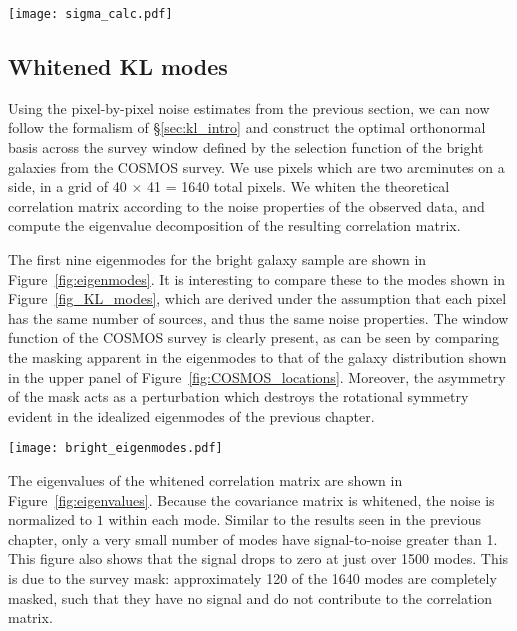 \begin{figure*}
 \centering
 \texttt{[image: sigma\_calc.pdf]}
 \caption{Bootstrap estimates of the shape noise for each pixel.  The estimates
   reflect an intrinsic ellipticity of $0.393 \pm 0.013$.
   \label{fig:bootstrap}}
\end{figure*}

\subsection{Whitened KL modes}
Using the pixel-by-pixel noise estimates from the previous section, we can
now follow the formalism of \S\ref{sec:kl_intro} and construct the optimal
orthonormal basis across the survey window defined by the selection function
of the bright galaxies from the COSMOS survey.  We use pixels which are
two arcminutes on a side, in a grid of 40 $\times$ 41 = 1640 total
pixels.  We whiten the theoretical correlation matrix according to the noise
properties of the observed data, and compute the eigenvalue decomposition
of the resulting correlation matrix.

The first nine eigenmodes for the bright galaxy sample
are shown in Figure~\ref{fig:eigenmodes}.
It is interesting to compare these to the modes shown in
Figure~\ref{fig_KL_modes}, which are derived under the assumption that
each pixel has the same number of sources, and thus the same noise properties.
The window function of the COSMOS survey is clearly present, as can be
seen by comparing the
masking apparent in the eigenmodes to that of the galaxy distribution
shown in the upper panel of Figure~\ref{fig:COSMOS_locations}.
Moreover, the asymmetry of the mask acts as a perturbation which destroys
the rotational symmetry evident in the idealized eigenmodes of
the previous chapter.

\begin{figure*}
 \centering
 \texttt{[image: bright\_eigenmodes.pdf]}
 \caption{
   The first nine 2D KL signal-to-noise eigenmodes
   for the COSMOS bright objects.  This uses square pixels which are
   two arcminutes on a side, leading to $41 \times 40 = 1640$ pixels
   over the entire field.}
   \label{fig:eigenmodes}
\end{figure*}

The eigenvalues of the whitened correlation matrix are shown in
Figure~\ref{fig:eigenvalues}.  Because the covariance matrix is
whitened, the noise is normalized to $1$ within each mode.
Similar to the results seen in the previous chapter, only a very small
number of modes have signal-to-noise greater than 1.
This figure also shows that the signal drops to zero at just over 1500
modes.  This is due to the survey mask: approximately 120 of the 1640
modes are completely masked, such that they have no signal and do not
contribute to the correlation matrix.


